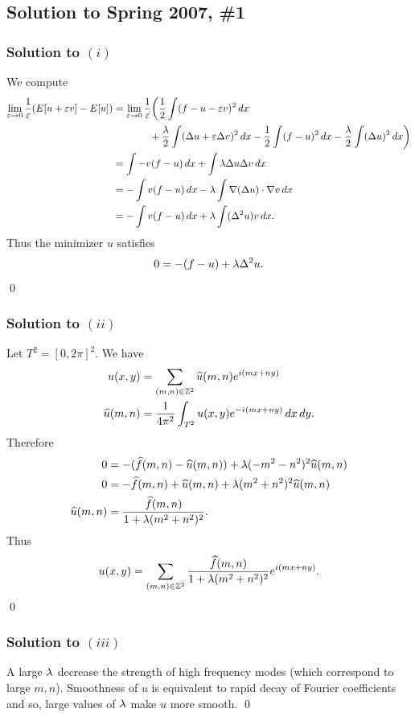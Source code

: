 \subsection*{Solution to Spring 2007, \#1}\label{s071}
\subsubsection*{Solution to $(i)$}
We compute
\begin{align*}
\lim_{\varepsilon \rightarrow 0}\frac{1}{\varepsilon}(E[u + \varepsilon v] - E[u]) &= \lim_{\varepsilon \rightarrow 0}\frac{1}{\varepsilon}\bigg(\frac{1}{2}\int (f - u - \varepsilon v)^{2}\, dx \\
&\hspace{0.5in}+ \frac{\lambda}{2}\int (\Delta u + \varepsilon \Delta v)^{2}\, dx - \frac{1}{2}\int (f - u)^{2}\, dx - \frac{\lambda}{2}\int (\Delta u)^{2}\, dx\bigg)\\
&=\int -v(f - u)\, dx + \int \lambda \Delta u\Delta v\, dx\\
&= -\int v(f - u)\, dx - \lambda\int \nabla(\Delta u)\cdot \nabla v \, dx\\
&= -\int v(f - u)\, dx + \lambda \int (\Delta^{2}u)v\, dx.
\end{align*}
Thus the minimizer $u$ satisfies $$0 = -(f - u) + \lambda \Delta^{2}u.$$
\hfill\qed

\subsubsection*{Solution to $(ii)$}
Let $T^{2} = [0, 2\pi]^{2}$. We have
\begin{align*}
u(x, y) &= \sum_{(m, n) \in \mathbb{Z}^2}\widehat{u}(m, n)e^{i(mx + ny)}\\
\widehat{u}(m, n) &= \frac{1}{4\pi^{2}}\int_{T^{2}}u(x, y)e^{-i(mx + ny)}\, dx\, dy.
\end{align*}
Therefore
\begin{align*}
0 &= -(\widehat{f}(m, n) - \widehat{u}(m, n)) + \lambda(-m^{2} - n^{2})^{2}\widehat{u}(m, n)\\
0 &= -\widehat{f}(m, n) + \widehat{u}(m, n) + \lambda(m^{2} + n^{2})^{2}\widehat{u}(m, n)\\
\widehat{u}(m, n) &= \frac{\widehat{f}(m, n)}{1 + \lambda(m^{2} + n^{2})^{2}}.
\end{align*}
Thus
$$u(x, y) = \sum_{(m, n) \in \mathbb{Z}^{2}}\frac{\widehat{f}(m, n)}{1 + \lambda(m^{2} + n^{2})^{2}}e^{i(mx + ny)}.$$
\hfill\qed

\subsubsection*{Solution to $(iii)$}
A large $\lambda$ decrease the strength of high frequency modes (which correspond to large $m, n$). Smoothness of $u$
is equivalent to rapid decay of Fourier coefficients and so, large values of $\lambda$ make $u$ more smooth.
\hfill\qed

